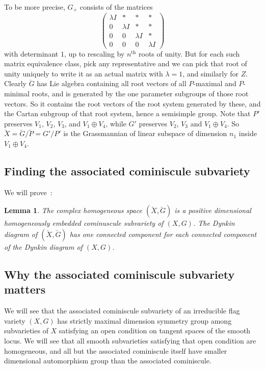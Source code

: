 \documentclass[a4paper,10pt]{amsart}
\newtheorem{lemma}{Lemma}
\theoremstyle{remark}
\begin{document}
To be more precise, \(G_+\) consists of the matrices 
\[
\begin{pmatrix}
\lambda I&*&*&*\\
0&\lambda I&*&*\\
0&0&\lambda I&*\\
0&0&0&\lambda I
\end{pmatrix}
\]
with determinant \(1\), up to rescaling by \(n^{\text{th}}\) roots of unity.
But for each such matrix equivalence class, pick any representative and we can pick that root of unity uniquely to write it as an actual matrix with \(\lambda=1\), and similarly for \(Z\).
Clearly \(\breve{G}\) has Lie algebra containing all root vectors of all \(P\)-maximal and \(P\)-minimal roots, and is generated by the one parameter subgroups of those root vectors.
So it contains the root vectors of the root system generated by these, and the Cartan subgroup of that root system, hence a semisimple group.
Note that \(P'\) preserves \(V_1\), \(V_2\), \(V_3\), and \(V_1\oplus V_4\), while
\(G'\) preserves \(V_2\), \(V_3\) and \(V_1\oplus V_4\).
So \(\breve{X}=\breve{G}/\breve{P}=G'/P'\) is the Grassmannian of linear subspace of dimension \(n_1\) inside \(V_1\oplus V_4\).

\subsection{Finding the associated cominiscule subvariety}
We will prove~:
\begin{lemma}\label{lemma:associated.cominuscule}
The complex homogeneous space \((\breve{X},\breve{G})\) is a positive dimensional homogeneously embedded cominuscule subvariety of \((X,G)\).
The Dynkin diagram of \((\breve{X},\breve{G})\) has one connected component for each connected component of the Dynkin diagram of \((X,G)\).
\end{lemma}
\subsection{Why the associated cominiscule subvariety matters}
We will see  that the associated cominiscule subvariety of an irreducible flag variety \((X,G)\) has strictly maximal dimension symmetry group among subvarieties of \(X\) satisfying an open condition on tangent spaces of the smooth locus.
We will see that all smooth subvarieties satisfying that open condition are homogeneous, and all but the associated cominiscule itself have smaller dimensional automorphism group than the associated cominiscule.
\end{document}
